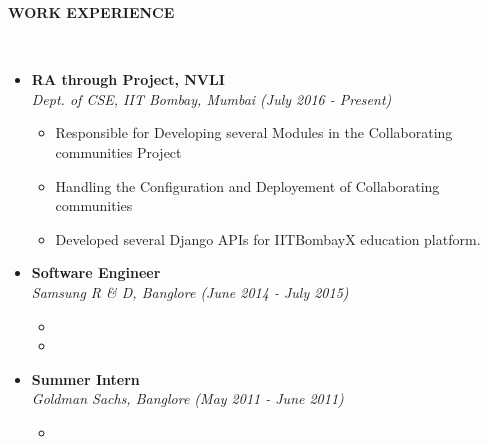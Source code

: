 \documentclass[a4paper,10pt]{article}
\newcommand{\isep}{-2 pt}
\newcommand{\lsep}{-0.5cm}
\newcommand{\resheading}[1]{{\small \colorbox{mygrey}{\begin{minipage}{0.975\textwidth}{\textbf{#1 \vphantom{p\^{E}}}}\end{minipage}}}}
\begin{document}
\resheading{\textbf{WORK EXPERIENCE} }\\[\lsep]
\begin{itemize}
	\item \noindent \textbf{RA through Project, NVLI}\\
	\emph{Dept. of CSE, IIT Bombay, Mumbai \hfill (July 2016 - Present)}\\[-0.6cm]
	\begin{itemize}\itemsep \isep
		\item \noindent Responsible for Developing several Modules in the Collaborating communities Project
		\item \noindent Handling the Configuration and Deployement of Collaborating communities
		\item \noindent Developed several Django APIs for IITBombayX education platform.

	\end{itemize}
	
	\item \noindent \textbf{Software Engineer}\\
	\emph{Samsung R & D, Banglore \hfill (June 2014 - July 2015)}\\[-0.6cm]
	\begin{itemize} \itemsep \isep
		\item {}
		\item {}
	\end{itemize}
	\item \noindent \textbf{Summer Intern}\\
	\emph{Goldman Sachs, Banglore \hfill (May 2011 - June 2011)}\\[-0.6cm]
	\begin{itemize}
	    \item {}
	\end{itemize}


\end{itemize}
\end{document}
